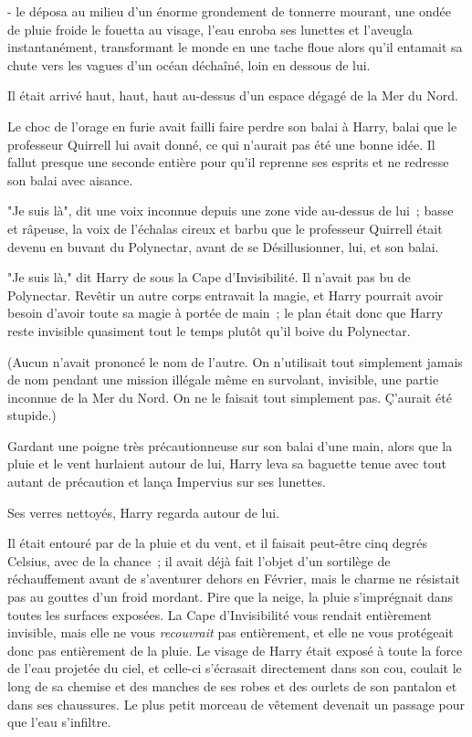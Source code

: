 - le déposa au milieu d'un énorme grondement de tonnerre mourant, une ondée de pluie froide le fouetta au visage, l'eau enroba ses lunettes et l'aveugla instantanément, transformant le monde en une tache floue alors qu'il entamait sa chute vers les vagues d'un océan déchaîné, loin en dessous de lui.

Il était arrivé haut, haut, haut au-dessus d'un espace dégagé de la Mer du Nord.

Le choc de l'orage en furie avait failli faire perdre son balai à Harry, balai que le professeur Quirrell lui avait donné, ce qui n'aurait pas été une bonne idée. Il fallut presque une seconde entière pour qu'il reprenne ses esprits et ne redresse son balai avec aisance.

"Je suis là", dit une voix inconnue depuis une zone vide au-dessus de lui~; basse et râpeuse, la voix de l'échalas cireux et barbu que le professeur Quirrell était devenu en buvant du Polynectar, avant de se Désillusionner, lui, et son balai.

"Je suis là," dit Harry de sous la Cape d'Invisibilité. Il n'avait pas bu de Polynectar. Revêtir un autre corps entravait la magie, et Harry pourrait avoir besoin d'avoir toute sa magie à portée de main~; le plan était donc que Harry reste invisible quasiment tout le temps plutôt qu'il boive du Polynectar.

(Aucun n'avait prononcé le nom de l'autre. On n'utilisait tout simplement jamais de nom pendant une mission illégale même en survolant, invisible, une partie inconnue de la Mer du Nord. On ne le faisait tout simplement pas. Ç'aurait été stupide.)

Gardant une poigne très précautionneuse sur son balai d'une main, alors que la pluie et le vent hurlaient autour de lui, Harry leva sa baguette tenue avec tout autant de précaution et lança Impervius sur ses lunettes.

Ses verres nettoyés, Harry regarda autour de lui.

Il était entouré par de la pluie et du vent, et il faisait peut-être cinq degrés Celsius, avec de la chance~; il avait déjà fait l'objet d'un sortilège de réchauffement avant de s'aventurer dehors en Février, mais le charme ne résistait pas au gouttes d'un froid mordant. Pire que la neige, la pluie s'imprégnait dans toutes les surfaces exposées. La Cape d'Invisibilité vous rendait entièrement invisible, mais elle ne vous \emph{recouvrait} pas entièrement, et elle ne vous protégeait donc pas entièrement de la pluie. Le visage de Harry était exposé à toute la force de l'eau projetée du ciel, et celle-ci s'écrasait directement dans son cou, coulait le long de sa chemise et des manches de ses robes et des ourlets de son pantalon et dans ses chaussures. Le plus petit morceau de vêtement devenait un passage pour que l'eau s'infiltre.

